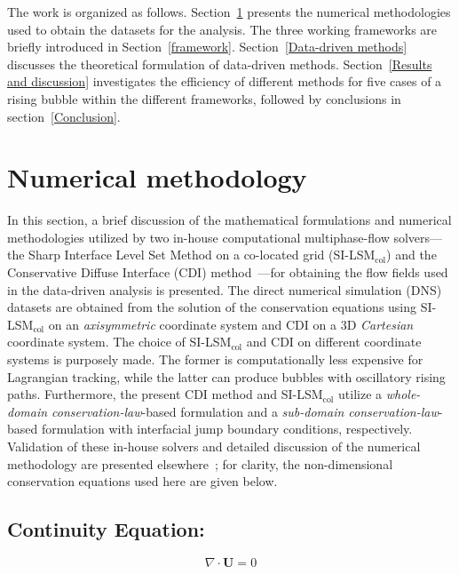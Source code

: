 \documentclass[a4paper,fleqn]{cas-sc}
\begin{document}
	The work is organized as follows. Section~\ref{Numerical methodology} presents the numerical methodologies used to obtain the datasets for the analysis. The three working frameworks are briefly introduced in Section~\ref {framework}. Section~\ref {Data-driven methods} discusses the theoretical formulation of data-driven methods. Section~\ref{Results and discussion} investigates the efficiency of different methods for five cases of a rising bubble within the different frameworks, followed by conclusions in section~\ref{Conclusion}.
	\section{Numerical methodology}
	\label{Numerical methodology}
	
	In this section, a brief discussion of the mathematical formulations and numerical methodologies utilized by two in-house computational multiphase-flow solvers---the Sharp Interface Level Set Method on a co-located grid (SI-LSM$_{\text{col}}$) \cite{Chirammel2023} and the Conservative Diffuse Interface (CDI) method~\cite{Jain2020}---for obtaining the flow fields used in the data-driven analysis is presented. The direct numerical simulation (DNS) datasets are obtained from the solution of the conservation equations using SI-LSM$_{\text{col}}$ on an \textit{axisymmetric} coordinate system and CDI on a 3D \textit{Cartesian} coordinate system. The choice of SI-LSM$_{\text{col}}$ and CDI on different coordinate systems is purposely made. The former is computationally less expensive for Lagrangian tracking, while the latter can produce bubbles with oscillatory rising paths. Furthermore, the present CDI method and SI-LSM$_{\text{col}}$ utilize a \textit{whole-domain conservation-law}-based formulation and a \textit{sub-domain conservation-law}-based formulation with interfacial jump boundary conditions, respectively. Validation of these in-house solvers and detailed discussion of the numerical methodology are presented elsewhere~\cite{Chirammel2023, Salimi2025}; for clarity, the non-dimensional conservation equations used here are given below.
	
	\subsection*{Continuity Equation:}
	\begin{equation}\label{eqt:continuity}
		\nabla\cdot\mathbf{U}=0
	\end{equation}
\end{document}
